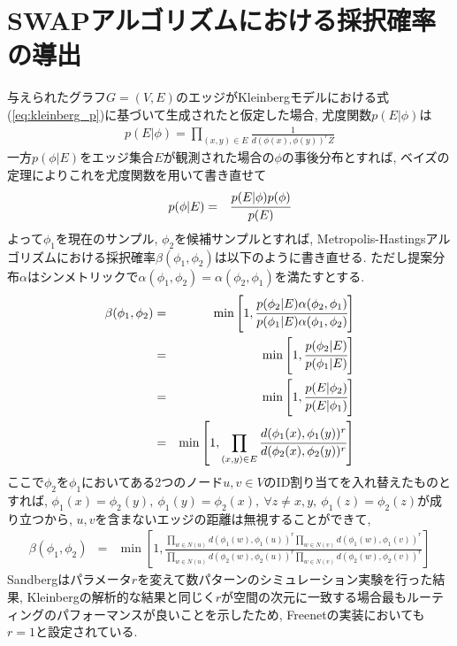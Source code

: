 \documentclass[dvipdfmx]{ampbt}
\begin{document}
\section{SWAPアルゴリズムにおける採択確率の導出}
   与えられたグラフ$G=(V,E)$のエッジがKleinbergモデルにおける式(\ref{eq:kleinberg_p})に基づいて生成されたと仮定した場合, 尤度関数$p(E|\phi)$は
   \begin{eqnarray*}
    p(E|\phi) = \prod_{(x,y) \in E}\frac{1}{d(\phi(x), \phi(y))^rZ}
   \end{eqnarray*}
   一方$p(\phi|E)$をエッジ集合$E$が観測された場合の$\phi$の事後分布とすれば, ベイズの定理によりこれを尤度関数を用いて書き直せて
   \begin{eqnarray*}
    p(\phi|E) &=&\cfrac{p(E|\phi)p(\phi)}{p(E)} \label{eq:posteri}
   \end{eqnarray*}
   よって$\phi_1$を現在のサンプル, $\phi_2$を候補サンプルとすれば, Metropolis-Hastingsアルゴリズムにおける採択確率$\beta(\phi_1,\phi_2)$は以下のように書き直せる. ただし提案分布$\alpha$はシンメトリックで$\alpha(\phi_1, \phi_2 ) = \alpha(\phi_2, \phi_1 )$を満たすとする. 
   \begin{eqnarray*}
    \beta (\phi_1, \phi_2) &=& \min \left[1, \cfrac{p(\phi_2|E)\alpha(\phi_2, \phi_1)}{p(\phi_1|E)\alpha(\phi_1, \phi_2)}\right] \\
                           &=& \min \left[1, \cfrac{p(\phi_2|E)}{p(\phi_1|E)}\right] \\
                           &=& \min \left[1, \cfrac{p(E|\phi_2)}{p(E|\phi_1)}\right] \\
    &=& \min \left[1, \prod_{(x,y) \in E}\cfrac{d(\phi_1(x), \phi_1(y))^r}{d(\phi_2(x), \phi_2(y))^r}\right] \\
   \end{eqnarray*}
ここで$\phi_2$を$\phi_1$においてある2つのノード$u,v \in V$のID割り当てを入れ替えたものとすれば, $\phi_1(x)=\phi_2 (y),\ \phi_1(y)=\phi_2 (x),\ \forall z \neq x, y,\ \phi_1(z)=\phi_2(z)$が成り立つから, $u,v$を含まないエッジの距離は無視することができて, 
\begin{eqnarray*}
     \beta(\phi_1, \phi_2)&=&\min \left[1, \frac{\prod_{w \in N(u)}d(\phi_1(w), \phi_1(u))^r\prod_{w \in N(v)}d(\phi_1(w), \phi_1(v))^r}{\prod_{w \in N(u)}d(\phi_2(w), \phi_2(u))^r\prod_{w \in N(v)}d(\phi_2(w), \phi_2(v))^r}\right] 
\end{eqnarray*}
Sandbergはパラメータ$r$を変えて数パターンのシミュレーション実験を行った結果, Kleinbergの解析的な結果と同じく$r$が空間の次元に一致する場合最もルーティングのパフォーマンスが良いことを示したため, Freenetの実装においても$r=1$と設定されている. 


\fi
\ifoutputcover
\evenclearpage
\makecover                      %
\makespine[1]                   %
\makeinsidecover                %
\fi
\ifoutputabstractforsubmission
\makeabstractforsubmission      %
\fi
\end{document}
